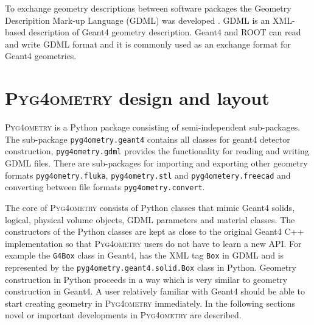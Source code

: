 \documentclass[final,5p,times,twocolumn]{elsarticle}
\newcommand{\pyinline}[1]{\lstinline[postbreak={}]{#1}}
\newcommand{\PYGEOMETRY}{\textsc{Pyg4ometry}}
\begin{document}
To exchange geometry descriptions between software packages the Geometry Descripition Mark-up Language (GDML) was developed \cite{GDML}. 
GDML is an XML-based description of Geant4 geometry description. Geant4 and ROOT \cite{fons_rademakers_2019_3895860} can read and write 
GDML format and it is commonly used as an exchange format for Geant4 geometries. 

\section{\PYGEOMETRY{} design and layout}
\PYGEOMETRY{} is a Python package consisting of semi-independent sub-packages. The sub-package \pyinline{pyg4ometry.geant4} contains all classes for 
geant4 detector construction, \pyinline{pyg4ometry.gdml} provides the functionality for reading and writing GDML files. There are sub-packages for importing and exporting other geometry formats  \pyinline{pyg4ometry.fluka}, \pyinline{pyg4ometry.stl} and \pyinline{pyg4ometery.freecad} and converting between file formats \verb|pyg4ometry.convert|.

The core of \PYGEOMETRY{} consists of Python classes that mimic Geant4 solids, logical, physical volume objects, GDML parameters and material classes.
The constructors of the Python classes are kept as close to the original Geant4 C++ implementation so that \PYGEOMETRY{} users do not have to learn 
a new API. For example the \verb|G4Box| class in Geant4, has the XML tag \verb|Box| in GDML and is represented by the \pyinline{pyg4ometry.geant4.solid.Box} class in 
Python. Geometry construction in Python proceeds in a way which is very similar to geometry construction in Geant4. A user relatively familiar with Geant4
should be able to start creating geometry in \PYGEOMETRY{} immediately. In the following sections novel or important developments in \PYGEOMETRY{} are described.  
\end{document}
